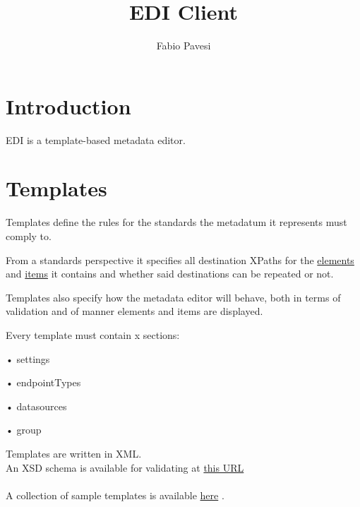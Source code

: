 \documentclass[10pt]{article}
\author{Fabio Pavesi}
\title{EDI Client}
\begin{document}
\maketitle
\newpage
\tableofcontents
\newpage

	\section{Introduction}
		EDI is a template-based metadata editor.
		
	\section{Templates}
	Templates define the rules for the standards the metadatum it represents must comply to.
	
	From a standards perspective it specifies all destination XPaths for the \hyperref[element]{elements} and \hyperref[item]{items} it contains and whether said destinations can be repeated or not.
	
	Templates also specify how the metadata editor will behave, both in terms of validation and of manner elements and items are displayed.
	
	Every template must contain x sections:
	
	• settings
	
	• endpointTypes
	
	• datasources
	
	• group
	
	Templates are written in XML.
	\\
	
	
	An XSD schema  is available for validating at \href{https://github.com/SP7-Ritmare/EDI-NG_client/blob/v3.1/node_launcher/src/templates/edi_template.xsd}{this URL} 
	\\
	\\
	A collection of sample templates is available \href{https://github.com/SP7-Ritmare/EDI-NG_client/tree/v3.1/node_launcher/src/templates}{here} .
	\\
	
	
	
	
	

\newpage
\listoftodos
\end{document}
